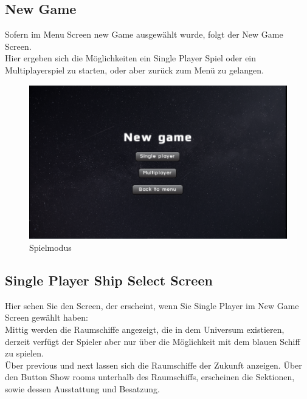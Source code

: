 \documentclass[fontsize=12pt,paper=a4,twoside]{scrartcl}
\begin{document}
\newpage
\subsection{New Game}

Sofern im Menu Screen new Game ausgewählt wurde, folgt der New Game Screen.\\
Hier ergeben sich die Möglichkeiten ein Single Player Spiel oder ein Multiplayerspiel zu starten, oder aber zurück zum Menü zu gelangen.\\

\begin{figure}[htp]
	\centering
	\includegraphics[width=1.00\linewidth]{pics/gamemodescreen.png}
	\caption{Spielmodus}
\end{figure}

\subsection{Single Player Ship Select Screen}

Hier sehen Sie den Screen, der erscheint, wenn Sie Single Player im New Game Screen gewählt haben:\\
Mittig werden die Raumschiffe angezeigt, die in dem Universum existieren, derzeit verfügt der Spieler aber nur über die Möglichkeit mit dem blauen Schiff zu spielen.\\
Über previous und next lassen sich die Raumschiffe der Zukunft anzeigen. Über den Button Show rooms unterhalb des Raumschiffs, erscheinen die Sektionen, sowie dessen Ausstattung
und Besatzung.
\end{document}
